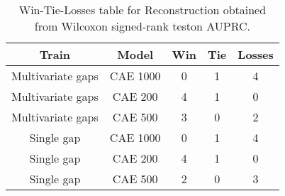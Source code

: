 \begin{table}[H]
\centering
\begin{tabular}{|c|c|c|c|c|}

    \textbf{Train} & \textbf{Model} &  \textbf{Win} &  \textbf{Tie} &  \textbf{Losses} \\
\hline

 Multivariate gaps &       CAE 1000 &             0 &             1 &                4 \\
\hline
 Multivariate gaps &        CAE 200 &             4 &             1 &                0 \\
\hline
 Multivariate gaps &        CAE 500 &             3 &             0 &                2 \\
\hline
        Single gap &       CAE 1000 &             0 &             1 &                4 \\
\hline
        Single gap &        CAE 200 &             4 &             1 &                0 \\
\hline
        Single gap &        CAE 500 &             2 &             0 &                3 \\
\hline

\end{tabular}
\caption{Win-Tie-Losses table for Reconstruction obtained from Wilcoxon signed-rank teston AUPRC.}
\label{tab:reconstruction_model_training_data_comparison}
\end{table}